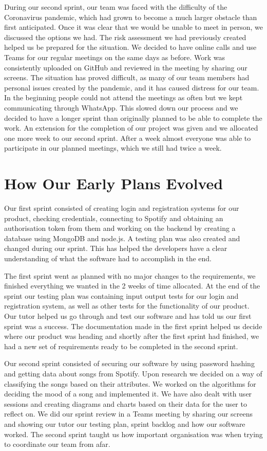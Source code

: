 \documentclass[10pt, notitlepage]{report}
\begin{document}
During our second sprint, our team was faced with the difficulty of the Coronavirus pandemic, which had grown to become a much larger obstacle than first anticipated. Once it was clear that we would be unable to meet in person, we discussed the options we had. The risk assessment we had previously created helped us be prepared for the situation. We decided to have online calls and use Teams for our regular meetings on the same days as before. Work was consistently uploaded on GitHub and reviewed in the meeting by sharing our screens. The situation has proved difficult, as many of our team members had personal issues created by the pandemic, and it has caused distress for our team. In the beginning people could not attend the meetings as often but we kept communicating through WhatsApp. This slowed down our process and we decided to have a longer sprint than originally planned to be able to complete the work. An extension for the completion of our project was given and we allocated one more week to our second sprint. After a week almost everyone was able to participate in our planned meetings, which we still had twice a week.

\section{How Our Early Plans Evolved}

Our first sprint consisted of creating login and registration systems for our product, checking credentials, connecting to Spotify and obtaining an authorisation token from them and working on the backend by creating a database using MongoDB and node.js. A testing plan was also created and changed during our sprint. This has helped the developers have a clear understanding of what the software had to accomplish in the end.

The first sprint went as planned with no major changes to the requirements, we finished everything we wanted in the 2 weeks of time allocated. At the end of the sprint our testing plan was containing input output tests for our login and registration system, as well as other tests for the functionality of our product. Our tutor helped us go through and test our software and has told us our first sprint was a success. The documentation made in the first sprint helped us decide where our product was heading and shortly after the first sprint had finished, we had a new set of requirements ready to be completed in the second sprint.

Our second sprint consisted of securing our software by using password hashing and getting data about songs from Spotify. Upon research we decided on a way of classifying the songs based on their attributes. We worked on the algorithms for deciding the mood of a song and implemented it. We have also dealt with user sessions and creating diagrams and charts based on their data for the user to reflect on. We did our sprint review in a Teams meeting by sharing our screens and showing our tutor our testing plan, sprint backlog and how our software worked. The second sprint taught us how important organisation was when trying to coordinate our team from afar.
\end{document}
